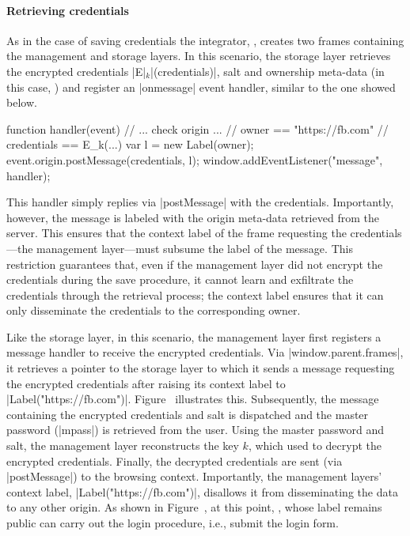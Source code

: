 \paragraph{Retrieving credentials}
%
As in the case of saving credentials the integrator, ,
creates two frames containing the management and storage layers.
%
In this scenario, the storage layer retrieves the encrypted credentials
\js|E|$_k$\js|(credentials)|, salt and ownership meta-data (in this
case, ) and register an \js|onmessage| event handler, 
similar to the one showed below. 
\begin{jscode}
function handler(event) {
  // ... check origin ...
  // owner == "https://fb.com"
  // credentials == E_k(...)
  var l = new Label(owner);
  event.origin.postMessage(credentials, l);
} 
window.addEventListener("message", handler);
\end{jscode}
This handler simply replies via \js|postMessage| with the credentials.
%
Importantly, however, the message is labeled with the origin meta-data
retrieved from the server.
%
This ensures that the context label of the frame requesting the
credentials---the management layer---must subsume the label of the message. 
%
This restriction guarantees that, even if the management layer did not encrypt the
credentials during the save procedure, it cannot learn and
exfiltrate the credentials through the retrieval process; the context
label ensures that it can only disseminate the credentials to the
corresponding owner.
%

Like the storage layer, in this scenario, the management layer first
registers a message handler to receive the encrypted credentials.
%
Via \js|window.parent.frames|, it retrieves a pointer to the
storage layer to which it sends a message requesting the encrypted
credentials after raising its context label to
\js|Label("https://fb.com")|.
%
Figure~ illustrates this.
%
Subsequently, the message containing the encrypted
credentials and salt is dispatched and the
master password (\js|mpass|) is retrieved from the user. 
%
Using the master password and salt, the management layer reconstructs
the key $k$, which used to decrypt the encrypted credentials.
%
Finally, the decrypted credentials are sent (via \js|postMessage|) to
the  browsing context.
%
Importantly, the management layers' context label,
\js|Label("https://fb.com")|, disallows it from disseminating the data
to any other origin.
%
As shown in Figure~, at this point,
, whose label remains public can carry out the login
procedure, i.e., submit the login form.


